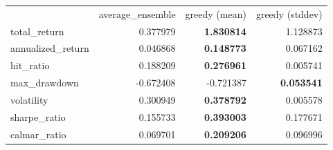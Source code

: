\begin{tabular}{lrrr}
 & average_ensemble & greedy (mean) & greedy (stddev) \\
total_return & 0.377979 & \bfseries 1.830814 & 1.128873 \\
annualized_return & 0.046868 & \bfseries 0.148773 & 0.067162 \\
hit_ratio & 0.188209 & \bfseries 0.276961 & 0.005741 \\
max_drawdown & -0.672408 & -0.721387 & \bfseries 0.053541 \\
volatility & 0.300949 & \bfseries 0.378792 & 0.005578 \\
sharpe_ratio & 0.155733 & \bfseries 0.393003 & 0.177671 \\
calmar_ratio & 0.069701 & \bfseries 0.209206 & 0.096996 \\
\end{tabular}
